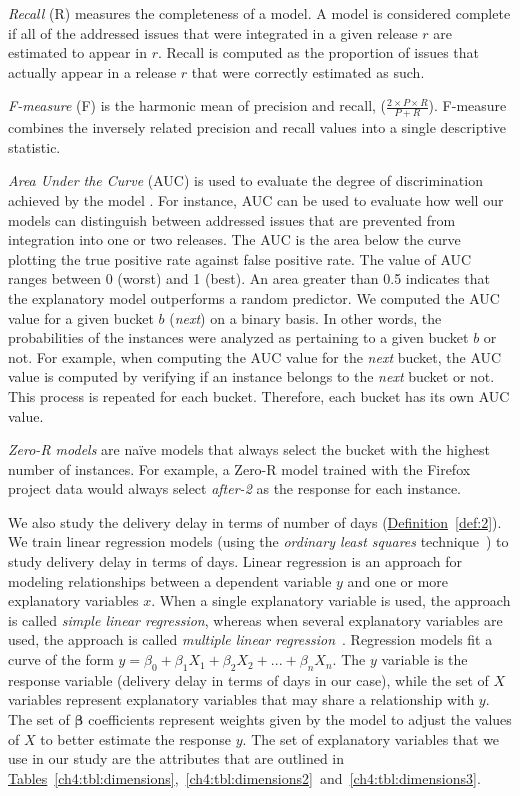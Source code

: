 \textit{Recall} (R) measures the completeness of a model. A model is considered
complete if all of the addressed issues that were integrated in a given release
\(r\) are estimated to appear in \(r\).  Recall is computed as the proportion of
issues that actually appear in a release \(r\) that were correctly estimated as
such.

\textit{F-measure} (F) is the harmonic mean of precision and recall, (\ie $\frac
{2 \times P \times R}{P + R}$). F-measure combines the inversely related
precision and recall values into a single descriptive statistic. 

\textit{Area Under the Curve} (AUC) is used to evaluate the degree of
discrimination achieved by the model \cite{hanley1982meaning}. For instance, AUC
can be used to evaluate how well our models can distinguish between addressed issues
that are prevented from integration into one or two releases. The AUC is the
area below the curve plotting the true positive rate against false positive
rate. The value of AUC ranges between 0 (worst) and 1 (best). An area greater
than 0.5 indicates that the explanatory model outperforms a random predictor. We
computed the AUC value for a given bucket \(b\) (\eg \textit{next}) on a binary
basis. In other words, the probabilities of the instances were analyzed as
pertaining to a given bucket \(b\) or not. For example, when computing the AUC
value for the \textit{next} bucket, the AUC value is computed by verifying if an
instance belongs to the \textit{next} bucket or not. This process is repeated
for each bucket. Therefore, each bucket has its own AUC value.  

\textit{Zero-R models} are na\"{i}ve models that always select the bucket with
the highest number of instances. For example, a Zero-R model trained with the
Firefox project data would always select \textit{after-2} as the response for
each instance. 

We also study the delivery delay in terms of number of days
(\hyperref[def:2]{Definition}~\ref{def:2}). We train linear regression models
(using the \textit{ordinary least squares} technique~\cite{springertexts}) to
study delivery delay in terms of days. Linear regression is an approach for
modeling relationships between a dependent variable $y$ and one or more
explanatory variables $x$. When a single explanatory variable is used, the
approach is called {\em simple linear regression}, whereas when several
explanatory variables are used, the approach is called {\em multiple linear
regression}~\cite{freedman2009statistical}.  Regression models fit a curve of
the form $y = \beta_0 + \beta_{1}X_1 + \beta_{2}X_2 + ... + \beta_{n}X_n$. The
$y$ variable is the response variable (\ie delivery delay in terms of days in
our case), while the set of ${X}$ variables represent explanatory variables that
may share a relationship with $y$. The set of $\boldsymbol{\beta}$ coefficients
represent weights given by the model to adjust the values of $X$ to better
estimate the response $y$. The set of explanatory variables that we use in our
study are the attributes that are outlined in
\hyperref[ch4:tbl:dimensions]{Tables}~\ref{ch4:tbl:dimensions},~\ref{ch4:tbl:dimensions2}~and~\ref{ch4:tbl:dimensions3}.  

